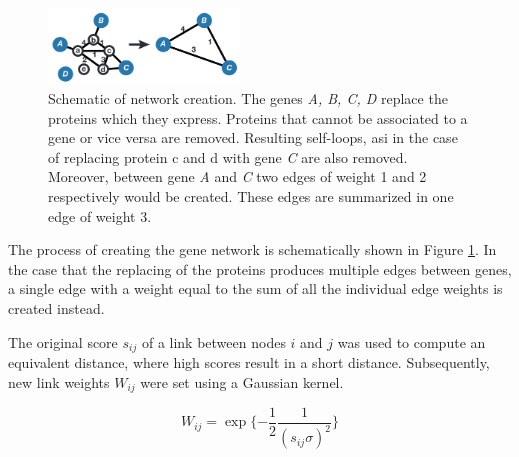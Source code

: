 \documentclass[10pt,conference,compsocconf]{IEEEtran}
\begin{document}
\begin{figure}
	\centering
	\includegraphics[width=0.45\textwidth]{network.png}
	\caption{Schematic of network creation.  The genes \textit{A, B, C, D} replace the proteins which they express. Proteins that cannot be associated to a gene or vice versa are removed. Resulting self-loops, asi in the case of replacing protein c and d with gene \textit{C} are also removed. Moreover, between gene \textit{A} and \textit{C} two edges of weight 1 and 2 respectively would be created. These edges are summarized in one edge of weight 3. }
	\label{fig:network_creation}
\end{figure}
The process of creating the gene network is schematically shown in Figure \ref{fig:network_creation}. In the case that the replacing of the proteins produces multiple edges between genes, a single edge with a weight equal to the sum of all the individual edge weights is created instead.
\par
The original score $s_{ij}$ of a link between nodes $i$ and $j$ was used to compute an equivalent distance, where high scores result in a short distance. Subsequently, new link weights $W_{ij}$ were set using a Gaussian kernel.

\begin{equation}
W_{ij} = \exp \{- \frac{1}{2}\frac{1}{(s_{ij} \sigma)^2}\}
\end{equation}
\end{document}
